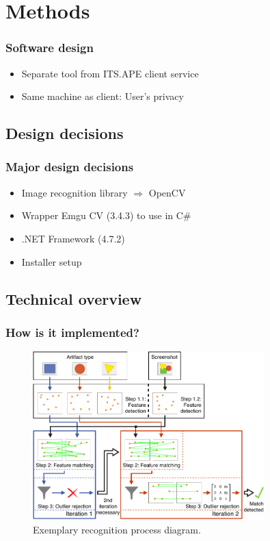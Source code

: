 \documentclass[xcolor=dvipsnames]{beamer}
\begin{document}
	\section{Methods}
	\begin{frame}
		\frametitle{Software design}
		\begin{itemize}
			\item Separate tool from ITS.APE client service
			\item Same machine as client: User's privacy
		\end{itemize}
	\end{frame}
	
	\subsection{Design decisions}
	\begin{frame}
		\frametitle{Major design decisions}
		\begin{itemize}
			\item Image recognition library $\Rightarrow$ OpenCV \cite{opencv}
			\item Wrapper Emgu CV (3.4.3) to use in C\# \cite{emgucv}
			\item .NET Framework (4.7.2) \cite{dotnet4_7_2}
			\item Installer setup
		\end{itemize}
	\end{frame}
	
	\subsection{Technical overview}
	\begin{frame}
		\frametitle{How is it implemented?}
		\begin{figure}[h]
			\centering
			\includegraphics[width=0.8\textwidth]{fig/rec-process}
			\caption{Exemplary recognition process diagram.}\label{fig:recognition-process}
		\end{figure}
	\end{frame}
	
\end{document}
